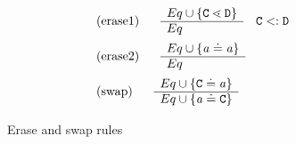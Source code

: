 \begin{figure}
\begin{align*}
&\begin{tabular}[t]{ll}
      (erase1)  & $ 
      \begin{array}[c]{ll}
        \begin{array}[c]{l}
          Eq \cup \set{\type{C} \lessdot \type{D}}\\
          \hline
          Eq
        \end{array}
        & \type{C} <: \type{D}
      \end{array}$\\
          \end{tabular}\\
&\begin{tabular}[t]{ll}
      (erase2)  & $ 
      \begin{array}[c]{ll}
        \begin{array}[c]{l}
          Eq \cup \set{\tv{a} \doteq \tv{a}}\\
          \hline
          Eq
        \end{array}
      \end{array}$\\
          \end{tabular}\\
    &      \begin{tabular}[t]{ll}
       (swap) & $
            \begin{array}[c]{ll}
              \begin{array}[c]{l}
                Eq \cup \set{\type{C} \doteq \tv{a}}\\
                \hline
                Eq \cup \set{\tv{a} \doteq \type{C}}
              \end{array}
            \end{array}$
          \end{tabular}
\end{align*}
\caption{Erase and swap rules}\label{fig:fgjerase-rules}
\end{figure}
